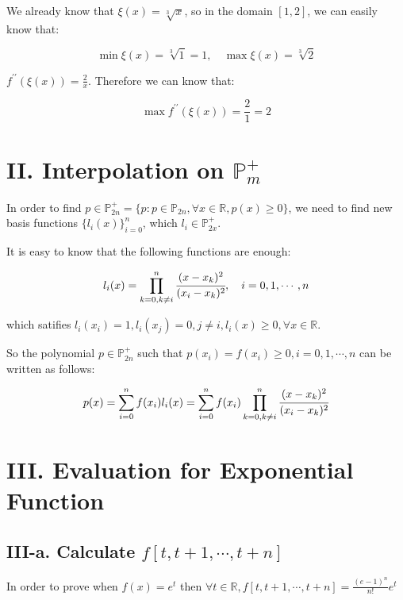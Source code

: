 \documentclass[a4paper]{article}
\begin{document}
We already know that $\xi(x) = \sqrt[3]{x}$, so in the domain $[1,2]$, we can easily know that:

\begin{equation}
  \min \xi(x) = \sqrt[3]{1} = 1, \quad \max \xi(x) = \sqrt[3]{2}
\end{equation}

$f^{\prime \prime}(\xi(x)) = \frac{2}{x}$. Therefore we can know that:

\begin{equation}
  \max f^{\prime \prime}(\xi(x)) = \frac{2}{1} = 2
\end{equation}

\section*{II. Interpolation on $\mathbb{P}_{m}^+$}

In order to find $p \in \mathbb{P}_{2n}^+ = \{p: p\in \mathbb{P}_{2n}, \forall x\in\mathbb{R}, p(x)\ge 0\}$, we need to find new basis functions $\{l_i(x)\}_{i=0}^{n}$, which $l_i \in \mathbb{P}_{2x}^+$. 

It is easy to know that the following functions are enough:

\begin{equation}
  l_i(x) = \prod_{k=0, k\neq i}^{n} \cfrac{(x-x_k)^2}{(x_i-x_k)^2}, \quad i=0,1,\cdots,n
\end{equation}

which satifies $l_i(x_i) = 1, l_i(x_j) = 0, j\neq i, l_i(x) \ge 0, \forall x\in\mathbb{R}$.

So the polynomial $p \in \mathbb{P}_{2n}^+$ such that $p(x_i) = f(x_i) \ge 0, i=0,1,\cdots,n$ can be written as follows:

\begin{equation}
  p(x) = \sum_{i=0}^{n} f(x_i) l_i(x) = \sum_{i=0}^{n} f(x_i) \prod_{k=0, k\neq i}^{n} \cfrac{(x-x_k)^2}{(x_i-x_k)^2}
\end{equation}

\section*{III. Evaluation for Exponential Function}

\subsection*{III-a. Calculate $f[t,t+1,\cdots, t+n]$}

In order to prove when $f(x) = e^t$ then $\forall t\in \mathbb{R}, f[t,t+1,\cdots, t+n] = \frac{(e-1)^n}{n!}e^t$
\end{document}
